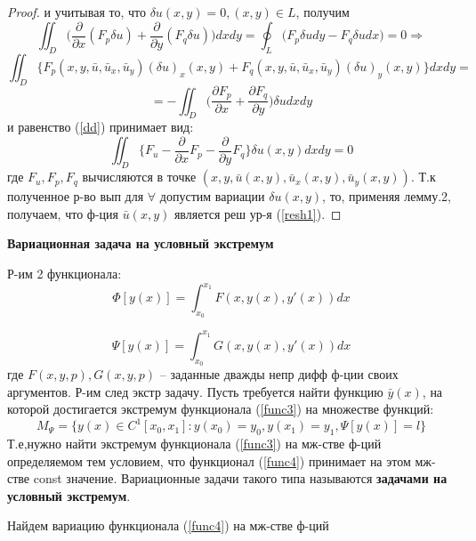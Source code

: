\begin{proof}
    и учитывая то, что $\delta u(x, y)=0, (x, y) \in L$, получим
    $$\iint_D \Big( \frac{\partial}{\partial x}(F_p\delta u) + \frac{\partial}{\partial y}(F_q\delta u)\Big)dxdy=\oint_L\Big(F_p\delta udy-F_q\delta udx\Big)=0\Longrightarrow$$
    $$\iint_D \Big\{ F_p(x,y,\bar u, \bar u_x, \bar u_y)(\delta u)_x(x, y)+F_q(x,y,\bar u, \bar u_x, \bar u_y)(\delta u)_y(x, y)\Big\}dxdy=$$
    $$=-\iint_D \Big( \frac{\partial F_p}{\partial x}+\frac{\partial F_q}{\partial y}\Big)\delta u dxdy$$
    и равенство (\ref{dd}) принимает вид:
    $$\iint_D \Big\{F_u-\frac{\partial}{\partial x}F_p-\frac{\partial}{\partial y}F_q\Big\}\delta u(x,y)dxdy=0$$
    где $F_u,F_p,F_q$ вычисляются в точке $(x, y, \bar u(x, y), \bar u_x(x, y), \bar u_y(x, y))$. Т.к полученное р-во вып для $\forall$ допустим вариации
    $\delta u(x, y)$, то, применяя лемму.2, получаем, что ф-ция $\bar u(x, y)$ является реш ур-я (\ref{resh1}).
\end{proof}

\textbf{Вариационная задача на условный экстремум}

Р-им 2 функционала:
\begin{equation}
    \Phi[y(x)]=\int_{x_0}^{x_1} F(x,y(x),y'(x))dx
    \label{func3}
\end{equation}

\begin{equation}
    \Psi[y(x)]=\int_{x_0}^{x_1} G(x,y(x),y'(x))dx
    \label{func4}
\end{equation}
где $F(x, y, p), G(x, y, p)$ – заданные дважды непр дифф ф-ции своих аргументов.
Р-им след экстр задачу. Пусть требуется найти функцию $\bar y(x)$, на которой достигается экстремум функционала (\ref{func3}) на множестве функций:
$$M_\Psi=\{y(x)\in C^1[x_0, x_1] : y(x_0) = y_0, y(x_1) = y_1, \Psi[y(x)]=l\}$$
Т.е,нужно найти экстремум функционала (\ref{func3}) на
мж-стве ф-ций определяемом тем условием, что функционал (\ref{func4})
принимает на этом мж-стве const значение. Вариационные задачи такого типа называются \textbf{задачами на условный экстремум}.

Найдем вариацию функционала (\ref{func4}) на мж-стве ф-ций 

